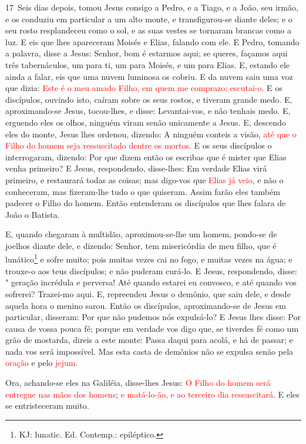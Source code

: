 \lettrine{17}\ Seis dias depois, tomou Jesus consigo a Pedro, e
a Tiago, e a João, seu irmão, e os conduziu em particular a um alto
monte, e transfigurou-se diante deles; e o seu rosto
resplandeceu como o sol, e as suas vestes se tornaram brancas como a
luz. E eis que lhes apareceram Moisés e Elias, falando com ele.
E Pedro, tomando a palavra, disse a Jesus: Senhor, bom é
estarmos aqui; se queres, façamos aqui três tabernáculos, um para
ti, um para Moisés, e um para Elias. E, estando ele ainda a
falar, eis que uma nuvem luminosa os cobriu. E da nuvem saiu uma voz
que dizia: \textcolor{red}{Este é o meu amado Filho, em quem me comprazo;
escutai-o}. E os discípulos, ouvindo isto, caíram sobre os seus
rostos, e tiveram grande medo. E, aproximando-se Jesus,
tocou-lhes, e disse: Levantai-vos, e não tenhais medo. E,
erguendo eles os olhos, ninguém viram senão unicamente a Jesus.
E, descendo eles do monte, Jesus lhes ordenou, dizendo: A
ninguém conteis a visão, \textcolor{red}{até que o Filho do homem seja
ressuscitado dentre os mortos}. E os seus discípulos o
interrogaram, dizendo: Por que dizem então os escribas que é mister
que Elias venha primeiro? E Jesus, respondendo, disse-lhes:
Em verdade Elias virá primeiro, e restaurará todas as coisas;
mas digo-vos que \textcolor{red}{Elias já veio}, e não o conheceram,
mas fizeram-lhe tudo o que quiseram. Assim farão eles também padecer
o Filho do homem. Então entenderam os discípulos que lhes
falara de João o Batista.

E, quando chegaram à multidão, aproximou-se-lhe um homem,
pondo-se de joelhos diante dele, e dizendo: Senhor, tem
misericórdia de meu filho, que é lunático\footnote{KJ: lunatic. Ed.
Contemp.: epiléptico.} e sofre muito; pois muitas vezes cai no fogo,
e muitas vezes na água; e trouxe-o aos teus discípulos; e não
puderam curá-lo. E Jesus, respondendo, disse: " geração
incrédula e perversa! Até quando estarei eu convosco, e até quando
vos sofrerei? Trazei-mo aqui. E, repreendeu Jesus o demônio,
que saiu dele, e desde aquela hora o menino sarou. Então os
discípulos, aproximando-se de Jesus em particular, disseram: Por que
não pudemos nós expulsá-lo? E Jesus lhes disse: Por causa de
vossa pouca fé; porque em verdade vos digo que, se tiverdes fé como
um grão de mostarda, direis a este monte: Passa daqui para acolá, e
há de passar; e nada vos será impossível. Mas esta casta de
demônios não se expulsa senão pela \textcolor{red}{oração} e pelo
\textcolor{red}{jejum}.

Ora, achando-se eles na Galiléia, disse-lhes Jesus: \textcolor{red}{O
Filho do homem será entregue nas mãos dos homens}; \textcolor{red}{e
matá-lo-ão, e ao terceiro dia ressuscitará}. E eles se entristeceram
muito.

